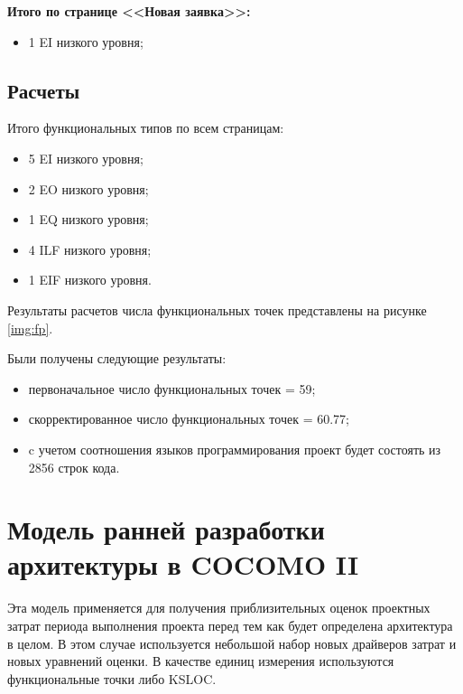 \documentclass{bmstu}
\begin{document}
\textbf{Итого по странице <<Новая заявка>>:}

\begin{itemize}
    \item 1 EI низкого уровня;
\end{itemize}


\subsection*{Расчеты}

Итого функциональных типов по всем страницам:

\begin{itemize}
    \item 5 EI низкого уровня;
    \item 2 EO низкого уровня;
    \item 1 EQ низкого уровня;
    \item 4 ILF низкого уровня;
    \item 1 EIF низкого уровня.
\end{itemize}

Результаты расчетов числа функциональных точек представлены на рисунке \ref{img:fp}.


\clearpage

Были получены следующие результаты:

\begin{itemize}
    \item первоначальное число функциональных точек = 59;
    \item скорректированное число функциональных точек = 60.77;
    \item c учетом соотношения языков программирования проект будет состоять из 2856 строк кода.
\end{itemize}

\section*{Модель ранней разработки архитектуры в COCOMO II}

Эта модель применяется для получения приблизительных оценок проектных затрат периода выполнения проекта перед тем как будет определена архитектура в целом. В этом случае используется небольшой набор новых драйверов затрат и новых уравнений оценки. В качестве единиц измерения используются функциональные точки либо KSLOC.
\end{document}
